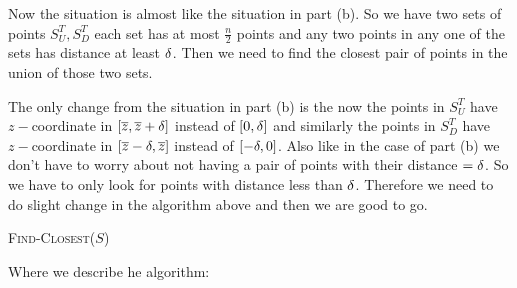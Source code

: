 \documentclass[a4paper, 11pt]{article}
\makeatletter
\newenvironment{listalgorithm}
{\par\noindent\hspace*{-\@totalleftmargin}%
	\minipage{\textwidth}\algorithm[H]}
{\endalgorithm\endminipage}
\makeatother
\begin{document}
{\begin{enumerate}[label=(\alph*)]
Now the situation is almost like the situation in part (b). So we have two sets of points $S_U^T,S_D^T$ each set has at most  $\frac{n}{2}$ points and any two points in any one of the sets has distance at least $\delta$. Then we need to find the closest pair of points in the union of those two sets.

The only change from the situation in part (b) is the now the points in $S_U^T$ have $z-$coordinate   in $[\overline{z},\overline{z}+\delta]$ instead of $[0,\delta]$ and similarly the points in $S_D^T$ have $z-$coordinate in $[\overline{z}-\delta,\overline{z}]$ instead of $[-\delta,0]$. Also like in the case of part (b) we don't have to worry about not having a pair of points with their distance $=\delta$. So we have to only look for points with distance less than $\delta$. Therefore we need to do slight change in the algorithm above and then we are good to go.\newpage

\begin{listalgorithm}
	\DontPrintSemicolon
	
	\caption{\textsc{Find-Closest}($S$)}
	\label{find-closest-nlog2n}	
\end{listalgorithm}
Where we describe he  algorithm:\parinf


\end{enumerate}}
\end{document}
